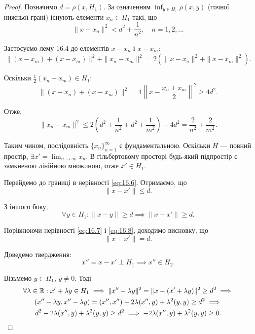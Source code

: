\begin{proof}
Позначимо $d = \rho(x, H_1)$. За означенням
$\inf_{y \in H_1} \rho(x, y)$ (точної нижньої грані) існують елементи
$x_n \in H_1$ такі, що
\begin{equation}
    \label{eq:16.6}
    \|x - x_n\|^2 < d^2 + \frac{1}{n^2}, \quad n = 1, 2, \dots
\end{equation}

Застосуємо лему 16.4 до елементів $x - x_n$ і $x - x_m$:
\begin{equation*}
    \|(x - x_m) + (x - x_m)\|^2 + \|x_n - x_m\|^2 =
    2 (\|x - x_n\|^2 + \|x - x_m\|^2).
\end{equation*}

Оскільки $\frac{1}{2}(x_n + x_m) \in H_1$:
\begin{equation*}
    \|(x - x_n) + (x - x_m)\|^2 =
    4 \left\| x - \frac{x_n + x_m}{2} \right\|^2 \ge
    4 d^2.
\end{equation*}

Отже,
\begin{equation*}
    \|x_n - x_m\|^2 \le
    2 \left(d^2 + \frac{1}{n^2} + d^2 + \frac{1}{m^2} \right) - 4 d^2 =
    \frac{2}{n^2} + \frac{2}{m^2}.
\end{equation*}

Таким чином, послідовність $\{x_n\}_{n = 1}^\infty$ є фундаментальною.
Оскільки $H$ --- повний простір, $\exists x' = \lim_{n \to \infty} x_n$.
В гільбертовому просторі будь-який підпростір є замкненою
лінійною множиною, отже $x' \in H_1$.

Перейдемо до границі в нерівності \eqref{eq:16.6}. Отримаємо, що
\begin{equation}
    \label{eq:16.7}
    \|x - x'\| \le d.
\end{equation}

З іншого боку,
\begin{equation}
    \label{eq:16.8}
    \forall y \in H_1: \|x - y\| \ge d \implies \|x - x'\| \ge d.
\end{equation}

Порівнюючи нерівності \eqref{eq:16.7} і \eqref{eq:16.8}, доходимо висновку, що
\begin{equation*}
    \|x - x'\| = d.
\end{equation*}

Доведемо твердження:
\begin{equation*}
    x'' = x - x' \perp H_1 \implies x'' \in H_2.
\end{equation*}

Візьмемо $y \in H_1$, $y \ne 0$. Тоді
\begin{multline*}
    \forall \lambda \in \mathbb{R}:
    x' + \lambda y \in H_1 \implies
    \|x'' - \lambda y\|^2 = \|x - (x' + \lambda y)\|^2 \ge d^2 \implies \\
    (x'' - \lambda y, x'' - \lambda y) = (x'', x'') - 2 \lambda (x'', y) + \lambda^2 (y, y) \ge d^2 \implies \\
    d^2 - 2 \lambda (x'', y) + \lambda^2 (y, y) \ge d^2 \implies
    - 2 \lambda (x'', y) + \lambda^2 (y, y) \ge 0.
\end{multline*}


\end{proof}
